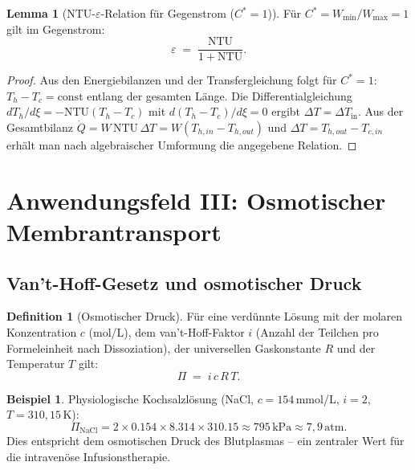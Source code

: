 ﻿\documentclass[a4paper,12pt]{article}
\theoremstyle{definition}
\newtheorem{definition}{Definition}
\newtheorem{beispiel}{Beispiel}
\newtheorem{lemma}{Lemma}
\begin{document}
\begin{lemma}[NTU-$\varepsilon$-Relation für Gegenstrom ($C^* = 1$)]
    Für $C^* = W_{\min}/W_{\max} = 1$ gilt im Gegenstrom:
    \[
        \varepsilon \;=\; \frac{\mathrm{NTU}}{1 + \mathrm{NTU}}.
    \]
\end{lemma}

\begin{proof}
    Aus den Energiebilanzen und der Transfergleichung folgt für $C^*=1$:
    $T_h - T_c = \text{const}$ entlang der gesamten Länge. Die Differentialgleichung
    $dT_h/d\xi = -\mathrm{NTU}(T_h - T_c)$ mit $d(T_h - T_c)/d\xi = 0$
    ergibt $\Delta T = \Delta T_{\text{in}}$. Aus der Gesamtbilanz
    $\dot{Q} = W\,\mathrm{NTU}\,\Delta T = W(T_{h,in} - T_{h,out})$
    und $\Delta T = T_{h,out} - T_{c,in}$ erhält man nach algebraischer
    Umformung die angegebene Relation. \qedhere
\end{proof}

\section{Anwendungsfeld III: Osmotischer Membrantransport}

\subsection{Van't-Hoff-Gesetz und osmotischer Druck}

\begin{definition}[Osmotischer Druck]
    Für eine verdünnte Lösung mit der molaren Konzentration $c$ (mol/L),
    dem van't-Hoff-Faktor $i$ (Anzahl der Teilchen pro Formeleinheit nach
    Dissoziation), der universellen Gaskonstante $R$ und der Temperatur $T$ gilt:
    \[
        \Pi \;=\; i\,c\,R\,T.
    \]
\end{definition}

\begin{beispiel}
    Physiologische Kochsalzlösung (NaCl, $c = 154$\,mmol/L, $i = 2$,
    $T = 310{,}15$\,K):
    \[
        \Pi_{\mathrm{NaCl}} = 2 \times 0.154 \times 8.314 \times 310.15
        \approx 795\,\mathrm{kPa} \approx 7{,}9\,\mathrm{atm}.
    \]
    Dies entspricht dem osmotischen Druck des Blutplasmas -- ein zentraler
    Wert für die intravenöse Infusionstherapie.
\end{beispiel}
\end{document}

